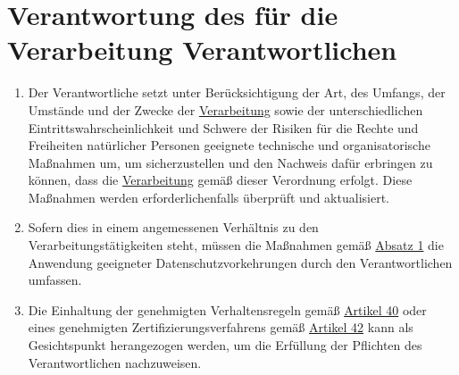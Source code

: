 \chapter{Verantwortung des für die Verarbeitung Verantwortlichen}
\label{ch:24}


\begin{enumerate}

  \item Der Verantwortliche setzt unter Berücksichtigung der Art, des Umfangs, der Umstände und der Zwecke der
   \hyperref[itm:04-2]{Verarbeitung} sowie der unterschiedlichen Eintrittswahrscheinlichkeit und Schwere der Risiken für die Rechte und
   Freiheiten natürlicher Personen geeignete technische und organisatorische Maßnahmen um, um sicherzustellen und den
   Nachweis dafür erbringen zu können, dass die \hyperref[itm:04-2]{Verarbeitung} gemäß dieser Verordnung erfolgt. Diese Maßnahmen werden
   erforderlichenfalls überprüft und aktualisiert.
  \label{itm:24-1}

  \item Sofern dies in einem angemessenen Verhältnis zu den Verarbeitungstätigkeiten steht, müssen die Maßnahmen gemäß
   \hyperref[itm:24-1]{Absatz 1} die Anwendung geeigneter Datenschutzvorkehrungen durch den Verantwortlichen umfassen.
  \label{itm:24-2}

  \item Die Einhaltung der genehmigten Verhaltensregeln gemäß \hyperref[ch:40]{Artikel 40} oder eines genehmigten
   Zertifizierungsverfahrens gemäß \hyperref[ch:42]{Artikel 42} kann als Gesichtspunkt herangezogen werden, um die
   Erfüllung der Pflichten des Verantwortlichen nachzuweisen.
  \label{itm:24-3}

\end{enumerate}


